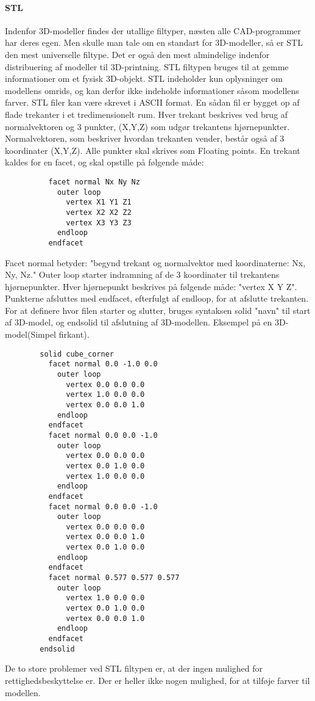 \paragraph{STL} %
\newline
Indenfor 3D-modeller findes der utallige filtyper, næsten alle CAD-programmer har deres egen. Men skulle man tale om en standart for 3D-modeller, så er STL den mest universelle filtype. Det er også den mest almindelige indenfor distribuering af modeller til 3D-printning. \autocite{makerbot}
STL filtypen bruges til at gemme informationer om et fysisk 3D-objekt. STL indeholder kun oplysninger om modellens omrids, og kan derfor ikke indeholde informationer såsom modellens farver. 
STL filer kan være skrevet i ASCII format. 
En sådan fil er bygget op af flade trekanter i et tredimensionelt rum. 
Hver trekant beskrives ved brug af normalvektoren og 3 punkter, (X,Y,Z) som udgør trekantens hjørnepunkter. Normalvektoren, som beskriver hvordan trekanten vender, består også af 3 koordinater (X,Y,Z). Alle punkter skal skrives som Floating points\autocite{stl}.
En trekant kaldes for en facet, og skal opstille på følgende måde:
\begin{lstlisting}
          facet normal Nx Ny Nz
            outer loop
              vertex X1 Y1 Z1
              vertex X2 X2 Z2
              vertex X3 Y3 Z3
            endloop
          endfacet
\end{lstlisting}
\newline
Facet normal betyder: "begynd trekant og normalvektor med koordinaterne: Nx, Ny, Nz." Outer loop starter indramning af de 3 koordinater til trekantens hjørnepunkter. Hver hjørnepunkt beskrives på følgende måde: "vertex X Y Z". Punkterne afsluttes med endfacet, efterfulgt af endloop, for at afslutte trekanten. 
For at definere hvor filen starter og slutter, bruges syntaksen solid "navn"  til start af 3D-model, og endsolid til afslutning af 3D-modellen.
Eksempel på en 3D-model(Simpel firkant)\autocite{Stl_Eksempel}.
\begin{lstlisting}
        solid cube_corner
          facet normal 0.0 -1.0 0.0
            outer loop
              vertex 0.0 0.0 0.0
              vertex 1.0 0.0 0.0
              vertex 0.0 0.0 1.0
            endloop
          endfacet
          facet normal 0.0 0.0 -1.0
            outer loop
              vertex 0.0 0.0 0.0
              vertex 0.0 1.0 0.0
              vertex 1.0 0.0 0.0
            endloop
          endfacet
          facet normal 0.0 0.0 -1.0
            outer loop
              vertex 0.0 0.0 0.0
              vertex 0.0 0.0 1.0
              vertex 0.0 1.0 0.0
            endloop
          endfacet
          facet normal 0.577 0.577 0.577
            outer loop
              vertex 1.0 0.0 0.0
              vertex 0.0 1.0 0.0
              vertex 0.0 0.0 1.0
            endloop
          endfacet
        endsolid
\end{lstlisting}
De to store problemer ved STL filtypen er, at der ingen mulighed for rettighedsbeskyttelse er. Der er heller ikke nogen mulighed, for at tilføje farver til modellen.